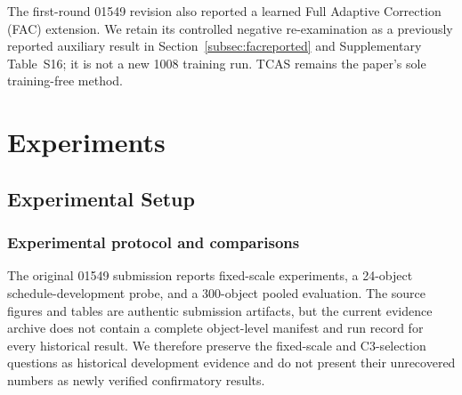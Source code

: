 \documentclass[times,twocolumn,final]{elsarticle}
\providecommand{\DIFadd}[1]{{\protect\color{blue} \sf #1}} %
\providecommand{\DIFaddbegin}{} %
\providecommand{\DIFaddend}{} %
\begin{document}
  \DIFaddbegin \DIFadd{The first-round 01549 revision also reported a learned }\DIFaddend Full Adaptive Correction (FAC)  
 \DIFaddbegin \DIFadd{extension. We retain its controlled negative re-examination as a previously reported auxiliary result in Section~\ref{subsec:facreported} and Supplementary Table~S16; it is not a new 1008 training run. TCAS remains the paper's sole training-free method}\DIFaddend .

\section{Experiments}
\label{sec:experiments}

\subsection{Experimental Setup}
\label{subsec:setup}

\subsubsection{Experimental protocol and comparisons}

  \DIFaddbegin \DIFadd{The original 01549 submission reports fixed-scale experiments, a 24-object schedule-development probe, and a 300-object pooled evaluation. The source figures and tables are authentic submission artifacts, but the current evidence archive does not contain a complete object-level manifest and run record for every historical result. We therefore preserve the fixed-scale }\DIFaddend and   \DIFaddbegin \DIFadd{C3-selection questions as historical development evidence and do not present their unrecovered numbers as newly verified confirmatory results.
}\DIFaddend 
\end{document}
